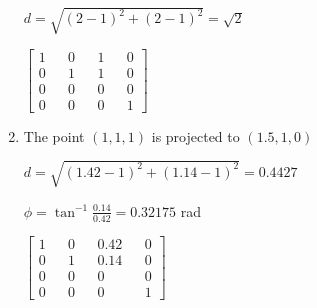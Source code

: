 \documentclass{article}
\begin{document}
\begin{enumerate}
        $d = \sqrt{(2 - 1)^2 + (2 - 1)^2} = \sqrt{2}$

        $\begin{bmatrix}
            1 && 0 && 1 && 0 \\ 
            0 && 1 && 1 && 0 \\ 
            0 && 0 && 0 && 0 \\ 
            0 && 0 && 0 && 1 
        \end{bmatrix}$

        \item The point $(1,1,1)$ is projected to $(1.5, 1, 0)$
                
        $d = \sqrt{(1.42 - 1)^2 + (1.14 -1)^2} = 0.4427$

        $\phi = \tan^{-1}\frac{0.14}{0.42} = 0.32175$ rad

        $\begin{bmatrix}
            1 && 0 && 0.42 && 0 \\ 
            0 && 1 && 0.14 && 0 \\ 
            0 && 0 && 0 && 0 \\ 
            0 && 0 && 0 && 1 
        \end{bmatrix}$ 
    \end{enumerate}

    \newpage
\end{document}
